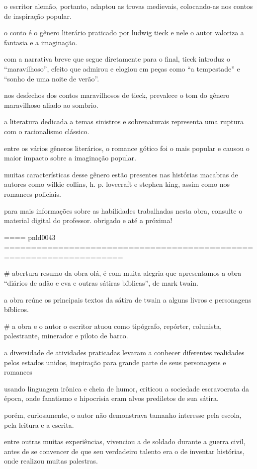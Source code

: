 o escritor alemão, portanto, adaptou as trovas medievais, colocando-as nos contos de inspiração popular.

o conto é o gênero literário praticado por ludwig tieck e nele o autor valoriza a fantasia e a imaginação.

com a narrativa breve que segue diretamente para o final, tieck introduz o “maravilhoso”, efeito que admirou e elogiou em peças como “a tempestade” e “sonho de uma noite de verão”. 

nos desfechos dos contos maravilhosos de tieck, prevalece o tom do gênero maravilhoso aliado ao sombrio.

a literatura dedicada a temas sinistros e sobrenaturais representa uma ruptura com o racionalismo clássico. 

entre os vários gêneros literários, o romance gótico foi o mais popular e causou o maior impacto sobre a imaginação popular.

muitas características desse gênero estão presentes nas histórias macabras de autores como wilkie collins, h. p. lovecraft e stephen king, assim como nos romances policiais. 


para mais informações sobre as habilidades trabalhadas nesta obra, consulte o material digital do professor. obrigado e até a próxima!

==== pnld0043 ====================================================================

# abertura resumo da obra
olá, é com muita alegria que apresentamos a obra “diários de adão e eva e outras sátiras bíblicas”, de mark twain.

a obra reúne os principais textos da sátira de twain a alguns livros e personagens bíblicos.


# a obra e o autor
o escritor atuou como tipógrafo, repórter, colunista, palestrante, minerador e piloto de barco.

a diversidade de atividades praticadas levaram a conhecer diferentes realidades pelos estados unidos, inspiração para grande parte de seus personagens e romances

usando linguagem irônica e cheia de humor, criticou a sociedade escravocrata da época, onde fanatismo e hipocrisia eram alvos prediletos de sua sátira.

porém, curiosamente, o autor não demonstrava tamanho interesse pela escola, pela leitura e a escrita.

entre outras muitas experiências, vivenciou a de soldado durante a guerra civil, antes de se convencer de que seu verdadeiro talento era o de inventar histórias, onde realizou muitas palestras.

